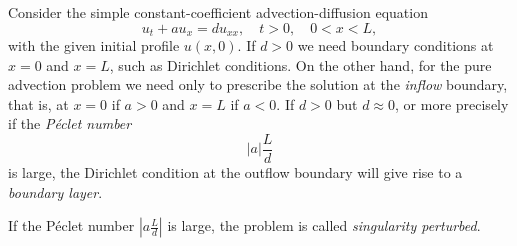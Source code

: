 \begin{frame}
	\begin{definition}
		Consider the simple constant-coefficient advection-diffusion
		equation
		\begin{equation*}
			u_{t}+
			au_{x}=
			du_{xx},\quad
			t>0,\quad
			0<x<L,
		\end{equation*}
		with the given initial profile $u\left(x,0\right)$.
		If $d>0$ we need boundary conditions at $x=0$ and $x=L$,
		such as Dirichlet conditions.
		On the other hand, for the pure advection problem we need
		only to prescribe the solution at the \emph{inflow} boundary,
		that is, at $x=0$ if $a>0$ and $x=L$ if $a<0$.
		If $d>0$ but $d\approx0$, or more precisely if the
		\emph{Péclet number}
		\begin{equation*}
			\left|a\right|\frac{L}{d}
		\end{equation*}
		is large, the Dirichlet condition at the outflow boundary
		will give rise to a \emph{boundary layer}.

		If the Péclet number $\left|a\frac{L}{d}\right|$ is large,
		the problem is called \emph{singularity perturbed}.
	\end{definition}
\end{frame}
